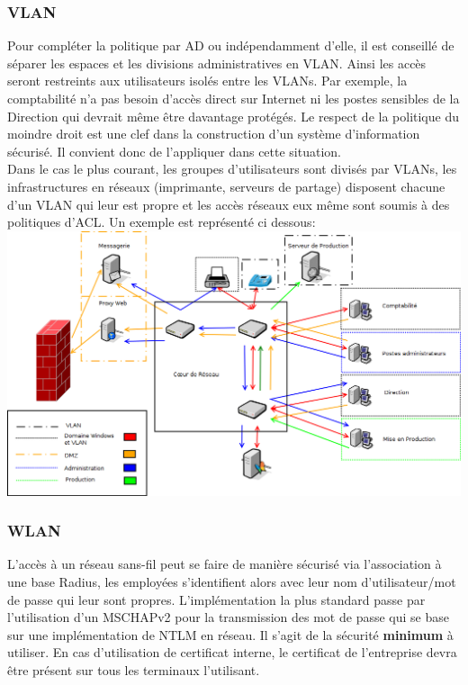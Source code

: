 \documentclass[twoside,a4paper,12pt,titlepage]{book}
\begin{document}
	\subsubsection{\gls{VLAN}}
	Pour compléter la politique par AD ou indépendamment d'elle, il est conseillé de séparer les espaces et les divisions administratives en VLAN. Ainsi les accès seront restreints aux utilisateurs isolés entre les \gls{VLAN}s. Par exemple, la comptabilité n'a pas besoin d'accès direct sur Internet ni les postes sensibles de la Direction qui devrait même être davantage protégés. Le respect de la politique du moindre droit est une clef dans la construction d'un système d'information sécurisé. Il convient donc de l'appliquer dans cette situation.\\
	Dans le cas le plus courant, les groupes d'utilisateurs sont divisés par \gls{VLAN}s, les infrastructures en réseaux (imprimante, serveurs de partage) disposent chacune d'un \gls{VLAN} qui leur est propre et les accès réseaux eux même sont soumis à des politiques d'\gls{ACL}. Un exemple est représenté ci dessous:\\
	\includegraphics[width=\textwidth]{auditarchi_2.png}
	\subsubsection{WLAN}
	L'accès à un réseau sans-fil peut se faire de manière sécurisé via l'association à une base Radius, les employées s'identifient alors avec leur nom d'utilisateur/mot de passe qui leur sont propres. L'implémentation la plus standard passe par l'utilisation d'un MSCHAPv2 pour la transmission des mot de passe qui se base sur une implémentation de NTLM en réseau. Il s'agit de la sécurité \textbf{minimum} à utiliser. En cas d'utilisation de certificat interne, le certificat de l'entreprise devra être présent sur tous les terminaux l'utilisant.
\end{document}
